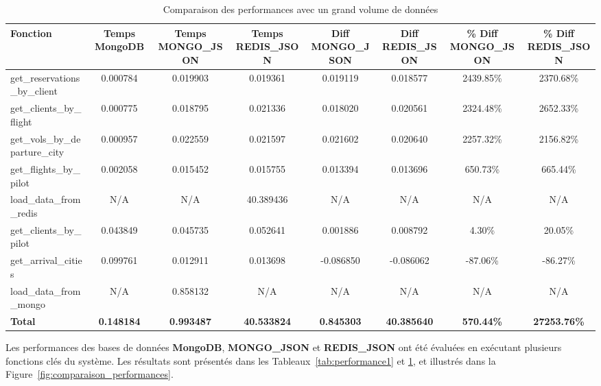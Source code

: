\begin{table}[htbp]
  \centering
  \caption{Comparaison des performances avec un grand volume de données}
  \label{tab:performance2}
  \begin{adjustbox}{width=\textwidth}
  \begin{tabular}{lccccccc}
  \toprule
  \textbf{Fonction} & \textbf{Temps MongoDB} & \textbf{Temps MONGO\_JSON} & \textbf{Temps REDIS\_JSON} & \textbf{Diff MONGO\_JSON} & \textbf{Diff REDIS\_JSON} & \textbf{\% Diff MONGO\_JSON} & \textbf{\% Diff REDIS\_JSON} \\
  \midrule
  get\_reservations\_by\_client & 0.000784 & 0.019903 & 0.019361 & 0.019119 & 0.018577 & 2439.85\% & 2370.68\% \\
  get\_clients\_by\_flight      & 0.000775 & 0.018795 & 0.021336 & 0.018020 & 0.020561 & 2324.48\% & 2652.33\% \\
  get\_vols\_by\_departure\_city & 0.000957 & 0.022559 & 0.021597 & 0.021602 & 0.020640 & 2257.32\% & 2156.82\% \\
  get\_flights\_by\_pilot       & 0.002058 & 0.015452 & 0.015755 & 0.013394 & 0.013696 & 650.73\%  & 665.44\%  \\
  load\_data\_from\_redis       & N/A      & N/A      & 40.389436 & N/A       & N/A       & N/A       & N/A       \\
  get\_clients\_by\_pilot       & 0.043849 & 0.045735 & 0.052641 & 0.001886 & 0.008792 & 4.30\%    & 20.05\%   \\
  get\_arrival\_cities          & 0.099761 & 0.012911 & 0.013698 & -0.086850 & -0.086062 & -87.06\%  & -86.27\%  \\
  load\_data\_from\_mongo       & N/A      & 0.858132 & N/A       & N/A       & N/A       & N/A       & N/A       \\
  \midrule
  \textbf{Total}                & \textbf{0.148184} & \textbf{0.993487} & \textbf{40.533824} & \textbf{0.845303} & \textbf{40.385640} & \textbf{570.44\%} & \textbf{27253.76\%} \\
  \bottomrule
  \end{tabular}
  \end{adjustbox}
\end{table}

Les performances des bases de données \textbf{MongoDB}, \textbf{MONGO\_JSON} et \textbf{REDIS\_JSON} ont été évaluées en exécutant plusieurs fonctions clés du système. Les résultats sont présentés dans les Tableaux~\ref{tab:performance1} et \ref{tab:performance2}, et illustrés dans la Figure~\ref{fig:comparaison_performances}.

